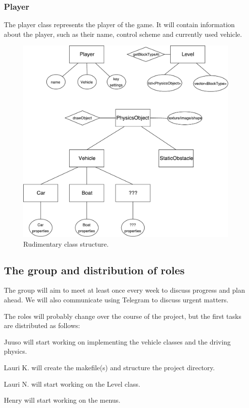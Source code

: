 \documentclass{article}
\begin{document}
\subsubsection*{Player}
The player class represents the player of the game. It will contain information about the player, such as their name, control scheme and currently used vehicle.

\begin{figure}[h]
\centering
\includegraphics[width=\textwidth]{classes.pdf}
\caption{Rudimentary class structure.}
\end{figure}

\subsection*{The group and distribution of roles}
The group will aim to meet at least once every week to discuss progress and plan ahead. We will also communicate using Telegram to discuss urgent matters.

The roles will probably change over the course of the project, but the first tasks are distributed as follows:

Juuso will start working on implementing the vehicle classes and the driving physics.

Lauri K. will create the makefile(s) and structure the project directory.

Lauri N. will start working on the Level class.

Henry will start working on the menus.
\end{document}
